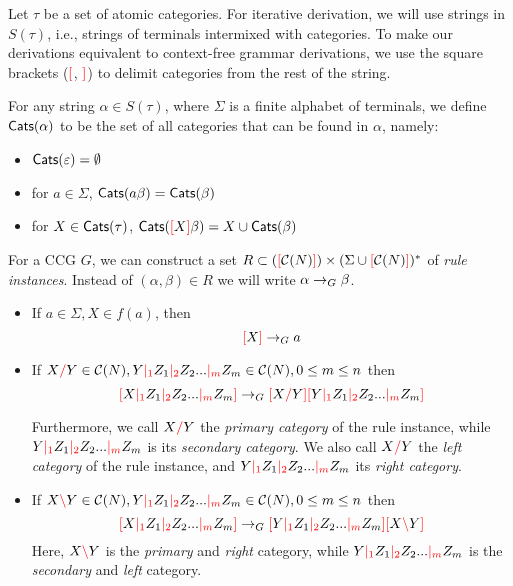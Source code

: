 \documentclass[main.tex]{subfiles}
\begin{document}
Let $\tau$ be a set of atomic categories.
For iterative derivation, we will use strings in $S(\tau)$,
i.e., strings of terminals intermixed with categories. To make our derivations
equivalent to context-free grammar derivations, we use the square
brackets ($\textcolor{red}{[}$, $\textcolor{red}{]}$) to delimit categories from the rest of the string.

\begin{defn}
    For any string $\alpha \in S(\tau)$, where $\Sigma$ is a
    finite alphabet of terminals, we define $\mathsf{Cats}( \alpha )$ to be the set of all
    categories that
    can be found in $\alpha$, namely:
    \begin{itemize}
        \item $\mathsf{Cats}( \varepsilon ) = \emptyset$
        \item for $a \in \Sigma$, $\mathsf{Cats}( a\beta ) = \mathsf{Cats}( \beta )$
        \item for $X \in \mathsf{Cats}( \tau )$, $\mathsf{Cats}( \textcolor{red}{[} X \textcolor{red}{]} \beta ) = X \cup \mathsf{Cats}( \beta )$
    \end{itemize}
\end{defn}

\begin{defn}\label{def:ccg:rules}
    For a CCG $G$, we can construct a set $R \subset (\textcolor{red}{[} \mathcal{C}( N ) \textcolor{red}{]}) \times (\Sigma \cup \textcolor{red}{[} \mathcal{C}( N ) \textcolor{red}{]})^*$
    of \emph{rule instances}. Instead of $(\alpha, \beta) \in R$ we will write
    $\alpha \rightarrow_G \beta$.

    \begin{itemize}
        \item If $ a \in \Sigma, X \in f(a) $, then \[ \textcolor{red}{[} X \textcolor{red}{]} \rightarrow_G a \]
        \item If $ X \textcolor{red}{/} Y \in \mathcal{C}( N ), Y \textcolor{red}{|_{1}} Z_1 \textcolor{red}{|_{2}} Z_2 ... \textcolor{red}{|_{m}} Z_m \in \mathcal{C}( N ), 0 \leq m \leq n $
            then \[ \textcolor{red}{[} X \textcolor{red}{|_{1}} Z_1 \textcolor{red}{|_{2}} Z_2 ... \textcolor{red}{|_{m}} Z_m \textcolor{red}{]} \rightarrow_G \textcolor{red}{[} X \textcolor{red}{/} Y \textcolor{red}{]} \textcolor{red}{[} Y \textcolor{red}{|_{1}} Z_1 \textcolor{red}{|_{2}} Z_2 ... \textcolor{red}{|_{m}} Z_m \textcolor{red}{]} \]

            Furthermore, we call $ X \textcolor{red}{/} Y $ the \emph{primary category} of the rule
            instance, while $ Y \textcolor{red}{|_{1}} Z_1 \textcolor{red}{|_{2}} Z_2 ... \textcolor{red}{|_{m}} Z_m $ is its
            \emph{secondary category}.
            We also call $ X \textcolor{red}{/} Y $ the \emph{left category} of the rule instance,
            and $  Y \textcolor{red}{|_{1}} Z_1 \textcolor{red}{|_{2}} Z_2 ... \textcolor{red}{|_{m}} Z_m $ its \emph{right category}.
        \item If $ X \textcolor{red}{\backslash} Y \in \mathcal{C}( N ), Y \textcolor{red}{|_{1}} Z_1 \textcolor{red}{|_{2}} Z_2 ... \textcolor{red}{|_{m}} Z_m \in \mathcal{C}( N ), 0 \leq m \leq n $
            then \[ \textcolor{red}{[} X \textcolor{red}{|_{1}} Z_1 \textcolor{red}{|_{2}} Z_2 ... \textcolor{red}{|_{m}} Z_m \textcolor{red}{]} \rightarrow_G \textcolor{red}{[} Y \textcolor{red}{|_{1}} Z_1 \textcolor{red}{|_{2}} Z_2 ... \textcolor{red}{|_{m}} Z_m \textcolor{red}{]} \textcolor{red}{[} X \textcolor{red}{\backslash} Y \textcolor{red}{]} \]
            Here, $ X \textcolor{red}{\backslash} Y $ is the \emph{primary} and \emph{right} category,
            while $ Y \textcolor{red}{|_{1}} Z_1 \textcolor{red}{|_{2}} Z_2 ... \textcolor{red}{|_{m}} Z_m $ is the \emph{secondary}
            and \emph{left} category.
    \end{itemize}
\end{defn}
\end{document}
